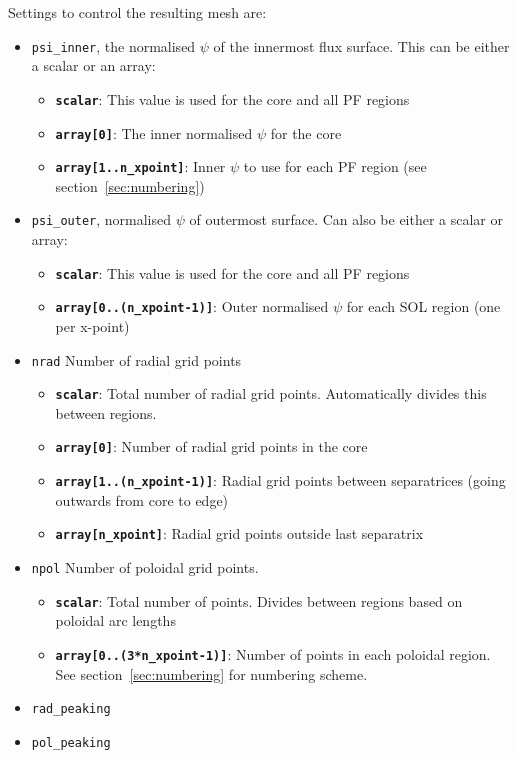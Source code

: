 \documentclass[12pt, a4paper]{article}
\newcommand{\code}[1]{\texttt{#1}}
\begin{document}
Settings to control the resulting mesh are:
\begin{itemize}
\item \code{psi\_inner}, the normalised $\psi$ of the innermost flux surface. 
  This can be either a scalar or an array:
  \begin{itemize}
    \item \code{{\bf scalar}}: This value is used for the core and all PF regions
    \item \code{{\bf array[0]}}: The inner normalised $\psi$ for the core
    \item \code{{\bf array[1..n\_xpoint]}}: Inner $\psi$ to use for each PF region
      (see section~\ref{sec:numbering})
  \end{itemize}
\item \code{psi\_outer}, normalised $\psi$ of outermost surface. Can also be
  either a scalar or array:
  \begin{itemize}
  \item \code{{\bf scalar}}: This value is used for the core and all PF regions
  \item \code{{\bf array[0..(n\_xpoint-1)]}}: Outer normalised $\psi$ for each SOL region
    (one per x-point)
  \end{itemize}
\item \code{nrad} Number of radial grid points
  \begin{itemize}
  \item \code{{\bf scalar}}: Total number of radial grid points. Automatically divides this
    between regions.
  \item \code{{\bf array[0]}}: Number of radial grid points in the core
  \item \code{{\bf array[1..(n\_xpoint-1)]}}: Radial grid points between separatrices
    (going outwards from core to edge)
  \item \code{{\bf array[n\_xpoint]}}: Radial grid points outside last separatrix
  \end{itemize}
\item \code{npol} Number of poloidal grid points.
  \begin{itemize}
  \item \code{{\bf scalar}}: Total number of points. Divides between regions based on
    poloidal arc lengths
  \item \code{{\bf array[0..(3*n\_xpoint-1)]}}: Number of points in each poloidal region. 
    See section~\ref{sec:numbering} for numbering scheme.
  \end{itemize}
\item \code{rad\_peaking}
\item \code{pol\_peaking}
\end{itemize}
\end{document}
